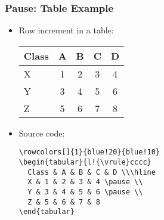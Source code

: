 \begin{frame}[fragile]
\frametitle{Pause: Table Example}%

  \begin{itemize}
    \item Row increment in a table:\pause \\
      \medskip
      \begin{tabular}{l!{\vrule}cccc}
        Class & A & B & C & D \\\hline
        X & 1 & 2 & 3 & 4 \pause \\
        Y & 3 & 4 & 5 & 6 \pause \\
        Z & 5 & 6 & 7 & 8
      \end{tabular}
    \vfill
    \item Source code:
      \begin{footnotesize}
        \begin{verbatim}
\rowcolors[]{1}{blue!20}{blue!10}
\begin{tabular}{l!{\vrule}cccc}
  Class & A & B & C & D \\\hline
  X & 1 & 2 & 3 & 4 \pause \\
  Y & 3 & 4 & 5 & 6 \pause \\
  Z & 5 & 6 & 7 & 8
\end{tabular}
        \end{verbatim}
      \end{footnotesize}
  \end{itemize}

\end{frame}
